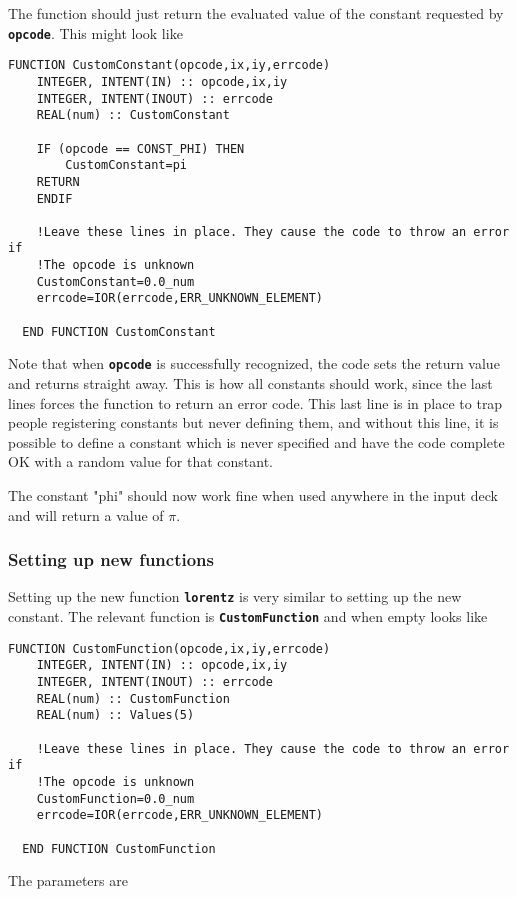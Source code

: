 \documentclass[12pt]{article}
\newcommand{\simpleboxverbatim}{\begin{Verbatim}[obeytabs=true,frame=single,
  framerule=0.5mm,rulecolor=\color{warwickmid}]}
\newcommand{\inlinecode}[1]{{\color{warwickred} \bf\texttt{#1}}}
\begin{document}
The function should just return the evaluated value of the constant requested
by \inlinecode{opcode}. This might look like

\simpleboxverbatim
  FUNCTION CustomConstant(opcode,ix,iy,errcode)
    INTEGER, INTENT(IN) :: opcode,ix,iy
    INTEGER, INTENT(INOUT) :: errcode
    REAL(num) :: CustomConstant

    IF (opcode == CONST_PHI) THEN
    	CustomConstant=pi
	RETURN
    ENDIF

    !Leave these lines in place. They cause the code to throw an error if
    !The opcode is unknown
    CustomConstant=0.0_num
    errcode=IOR(errcode,ERR_UNKNOWN_ELEMENT)

  END FUNCTION CustomConstant
\end{Verbatim}

Note that when \inlinecode{opcode} is successfully recognized, the code sets
the return value and returns straight away. This is how all constants should
work, since the last lines forces the function to return an error code. This
last line is in place to trap people registering constants but never defining
them, and without this line, it is possible to define a constant which is
never specified and have the code complete OK with a random value for that
constant.

The constant "phi" should now work fine when used anywhere in the input deck
and will return a value of $\pi$.

\subsubsection{Setting up new functions}

Setting up the new function \inlinecode{lorentz} is very similar to setting up
the new constant. The relevant function is \inlinecode{CustomFunction} and
when empty looks like

\simpleboxverbatim
  FUNCTION CustomFunction(opcode,ix,iy,errcode)
    INTEGER, INTENT(IN) :: opcode,ix,iy
    INTEGER, INTENT(INOUT) :: errcode
    REAL(num) :: CustomFunction
    REAL(num) :: Values(5)

    !Leave these lines in place. They cause the code to throw an error if
    !The opcode is unknown
    CustomFunction=0.0_num
    errcode=IOR(errcode,ERR_UNKNOWN_ELEMENT)

  END FUNCTION CustomFunction
\end{Verbatim}

The parameters are
\end{document}
